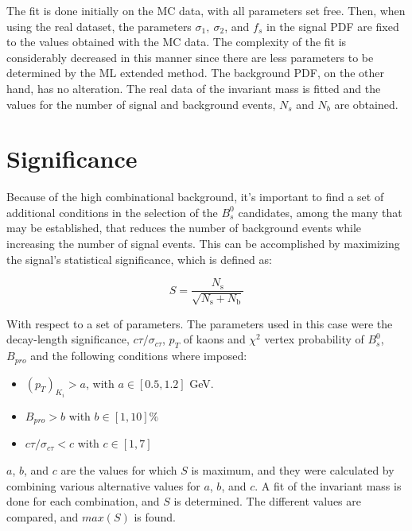 The fit is done initially on the MC data, with all parameters set free. Then, when using the real dataset, the parameters $\sigma_1, \ \sigma_2$, and $f_s$ in the signal PDF are fixed to the values obtained with the MC data. The complexity of the fit is considerably decreased in this manner since there are less parameters to be determined by the ML extended method. The background PDF, on the other hand, has no alteration. The real data of the invariant mass is fitted and the values for the number of signal and background events, $N_s$ and $N_b$ are obtained. 

\section{Significance}
\label{sec:sig}
Because of the high combinational background, it's important to find a set of additional conditions in the selection of the $B^0_s$ candidates, among the many that may be established, that reduces the number of background events while increasing the number of signal events. This can be accomplished by maximizing the signal's statistical significance, which is defined as:

\begin{equation}
	\label{eq:sig}
	S = \frac{N_{\text{s}}}{\sqrt{N_{\text{s}} + N_{\text{b}}}}
\end{equation}

With respect to a set of parameters. The parameters used in this case were the decay-length significance, $c\tau / \sigma_{c\tau}$, $p_T$ of kaons and $\chi^2$ vertex probability of $B^0_s$, $B_{pro}$ and the following conditions where imposed:

\begin{itemize}
	\item  $(p_T)_{K_i} > a$, with $a \in [0.5, 1.2]$ GeV.
	\item $B_{pro} > b$ with $b \in [1, 10] \%$ 
	\item $c\tau / \sigma_{c\tau} < c$ with $c \in [1, 7]$
\end{itemize}

$a$, $b$, and $c$ are the values for which $S$ is maximum, and they were calculated by combining various alternative values for $a$, $b$, and $c$. A fit of the invariant mass is done for each combination, and $S$ is determined. The different values are compared, and $max(S)$ is found.
